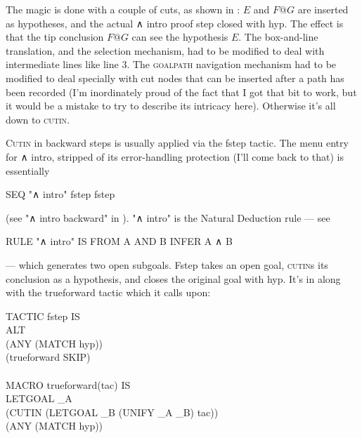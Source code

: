 The magic is done with a couple of cuts, as shown in : $E$ and $F@G$ are inserted as hypotheses, and the actual ∧ intro proof step closed with hyp. The effect is that the tip conclusion $F@G$ can see the hypothesis $E$. The box-and-line translation, and the selection mechanism, had to be modified to deal with intermediate lines like line 3. The \textsc{goalpath} navigation mechanism had to be modified to deal specially with cut nodes that can be inserted after a path has been recorded (I'm inordinately proud of the fact that I got that bit to work, but it would be a mistake to try to describe its intricacy here). Otherwise it's all down to \textsc{cutin}.

\textsc{Cutin} in backward steps is usually applied via the fstep tactic. The menu entry for ∧ intro, stripped of its error-handling protection (I'll come back to that) is essentially
\begin{japeish}
SEQ "∧ intro" fstep fstep
\end{japeish}
(see "∧ intro backward" in ). "∧ intro" is the Natural Deduction rule --- see 
\begin{japeish}
RULE "∧ intro" IS FROM A AND B INFER A ∧ B
\end{japeish}
--- which generates two open subgoals. Fstep takes an open goal, \textsc{cutin}s its conclusion as a hypothesis, and closes the original goal with hyp. It's in  along with the trueforward tactic which it calls upon:
\begin{japeish}
TACTIC fstep IS \\
\tab ALT \\
\tab \tab (ANY (MATCH hyp)) \\
\tab \tab (trueforward SKIP) \\
\\
MACRO trueforward(tac) IS \\
\tab LETGOAL \_A \\
\tab \tab (CUTIN (LETGOAL \_B (UNIFY \_A \_B) tac)) \\
\tab \tab (ANY (MATCH hyp))
\end{japeish}
